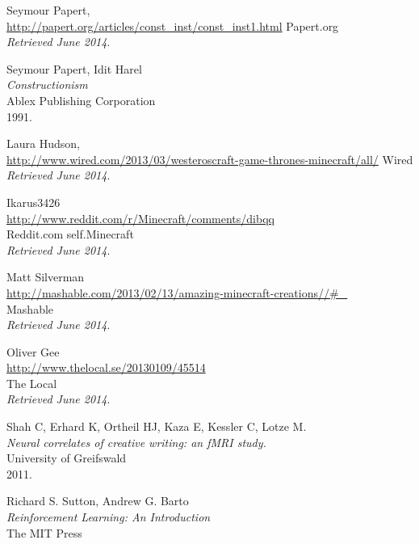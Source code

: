 \begin{thebibliography}{99}
  Seymour Papert, \\
  \url{http://papert.org/articles/const_inst/const_inst1.html}
  Papert.org \\
  \emph{Retrieved June 2014}.

  Seymour Papert, Idit Harel \\
  \emph{Constructionism} \\
  Ablex Publishing Corporation \\
  1991.

  Laura Hudson, \\
  \url{http://www.wired.com/2013/03/westeroscraft-game-thrones-minecraft/all/}
  Wired \\
  \emph{Retrieved June 2014}.

  Ikarus3426 \\
  \url{http://www.reddit.com/r/Minecraft/comments/dibqq} \\
  Reddit.com self.Minecraft \\
  \emph{Retrieved June 2014}.  

  Matt Silverman \\
  \url{http://mashable.com/2013/02/13/amazing-minecraft-creations//#_} \\
  Mashable \\
  \emph{Retrieved June 2014}.

  Oliver Gee \\
  \url{http://www.thelocal.se/20130109/45514} \\
  The Local \\
  \emph{Retrieved June 2014}.

  Shah C, Erhard K, Ortheil HJ, Kaza E, Kessler C, Lotze M. \\
  \emph{Neural correlates of creative writing: an fMRI study.} \\
  University of Greifswald \\
  2011.

  Richard S. Sutton, Andrew G. Barto \\
  \emph{Reinforcement Learning: An Introduction } \\
  The MIT Press \\

\end{thebibliography}

